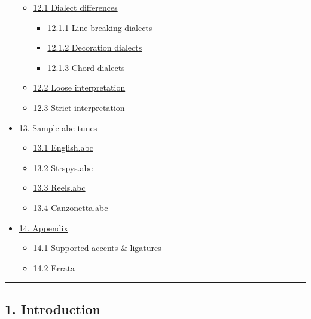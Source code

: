 \documentclass[oneside]{book}
\begin{document}
\begin{itemize}
  \begin{itemize}
  \item
    \protect\hyperlink{dialect_differences}{12.1 Dialect differences}

    \begin{itemize}
    \item
      \protect\hyperlink{line-breaking_dialects}{12.1.1 Line-breaking
      dialects}
    \item
      \protect\hyperlink{decoration_dialects}{12.1.2 Decoration
      dialects}
    \item
      \protect\hyperlink{chord_dialects}{12.1.3 Chord dialects}
    \end{itemize}
  \item
    \protect\hyperlink{loose_interpretation}{12.2 Loose interpretation}
  \item
    \protect\hyperlink{strict_interpretation}{12.3 Strict
    interpretation}
  \end{itemize}
\item
  \protect\hyperlink{sample_abc_tunes}{13. Sample abc tunes}

  \begin{itemize}
  \item
    \protect\hyperlink{englishabc}{13.1 English.abc}
  \item
    \protect\hyperlink{strspysabc}{13.2 Strspys.abc}
  \item
    \protect\hyperlink{reelsabc}{13.3 Reels.abc}
  \item
    \protect\hyperlink{canzonettaabc}{13.4 Canzonetta.abc}
  \end{itemize}
\item
  \protect\hyperlink{appendix}{14. Appendix}

  \begin{itemize}
  \item
    \protect\hyperlink{supported_accents_ligatures}{14.1 Supported
    accents \& ligatures}
  \item
    \protect\hyperlink{errata}{14.2 Errata}
  \end{itemize}
\end{itemize}

\begin{center}\rule{0.5\linewidth}{\linethickness}\end{center}

\hypertarget{introduction}{\subsection{1.
Introduction}\label{introduction}}
\end{document}
